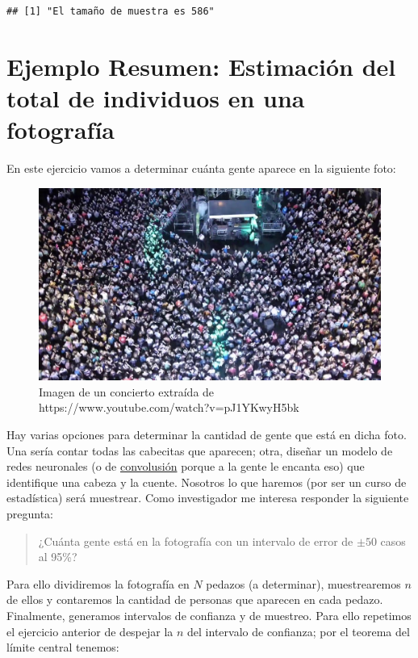 \documentclass[
]{book}
\begin{document}
\begin{verbatim}
## [1] "El tamaño de muestra es 586"
\end{verbatim}

\hypertarget{ejemplo-resumen-estimaciuxf3n-del-total-de-individuos-en-una-fotografuxeda}{%
\section{Ejemplo Resumen: Estimación del total de individuos en una fotografía}\label{ejemplo-resumen-estimaciuxf3n-del-total-de-individuos-en-una-fotografuxeda}}

En este ejercicio vamos a determinar cuánta gente aparece en la siguiente foto:

\begin{figure}

{\centering \includegraphics[width=0.75\linewidth]{images/concierto} 

}

\caption{Imagen de un concierto extraída de https://www.youtube.com/watch?v=pJ1YKwyH5bk}\label{fig:unnamed-chunk-156}
\end{figure}

Hay varias opciones para determinar la cantidad de gente que está en dicha foto. Una sería contar todas las cabecitas que aparecen; otra, diseñar un modelo de redes neuronales (o de \href{https://yangliang.github.io/pdf/sp055u.pdf}{convolusión} porque a la gente le encanta eso) que identifique una cabeza y la cuente. Nosotros lo que haremos (por ser un curso de estadística) será muestrear. Como investigador me interesa responder la siguiente pregunta:

\begin{quote}
¿Cuánta gente está en la fotografía con un intervalo de error de \(\pm 50\) casos al 95\%?
\end{quote}

Para ello dividiremos la fotografía en \(N\) pedazos (a determinar), muestrearemos \(n\) de ellos y contaremos la cantidad de personas que aparecen en cada pedazo. Finalmente, generamos intervalos de confianza y de muestreo. Para ello repetimos el ejercicio anterior de despejar la \(n\) del intervalo de confianza; por el teorema del límite central tenemos:
\end{document}
